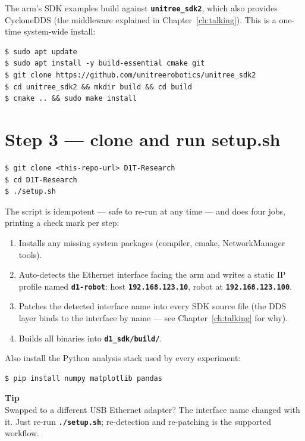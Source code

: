\documentclass[11pt,twoside,openright]{book}
\newcommand{\code}[1]{\texttt{\bfseries #1}}
\newenvironment{pkttip}{\begin{pktbox}\textbf{Tip}\\[4pt]}{\end{pktbox}}
\begin{document}
The arm's SDK examples build against \code{unitree\_sdk2}, which also
provides CycloneDDS (the middleware explained in
Chapter~\ref{ch:talking}). This is a one-time system-wide install:

\begin{lstlisting}
$ sudo apt update
$ sudo apt install -y build-essential cmake git
$ git clone https://github.com/unitreerobotics/unitree_sdk2
$ cd unitree_sdk2 && mkdir build && cd build
$ cmake .. && sudo make install
\end{lstlisting}

\section{Step 3 --- clone and run setup.sh}

\begin{lstlisting}
$ git clone <this-repo-url> D1T-Research
$ cd D1T-Research
$ ./setup.sh
\end{lstlisting}

The script is idempotent --- safe to re-run at any time --- and does four
jobs, printing a check mark per step:

\begin{enumerate}
  \item Installs any missing system packages (compiler, cmake,
    NetworkManager tools).
  \item Auto-detects the Ethernet interface facing the arm and writes a
    static IP profile named \code{d1-robot}: host
    \code{192.168.123.10}, robot at \code{192.168.123.100}.
  \item Patches the detected interface name into every SDK source file
    (the DDS layer binds to the interface by name --- see
    Chapter~\ref{ch:talking} for why).
  \item Builds all binaries into \code{d1\_sdk/build/}.
\end{enumerate}

Also install the Python analysis stack used by every experiment:

\begin{lstlisting}
$ pip install numpy matplotlib pandas
\end{lstlisting}

\begin{pkttip}
Swapped to a different USB Ethernet adapter? The interface name changed
with it. Just re-run \code{./setup.sh}; re-detection and re-patching is
the supported workflow.
\end{pkttip}
\end{document}
